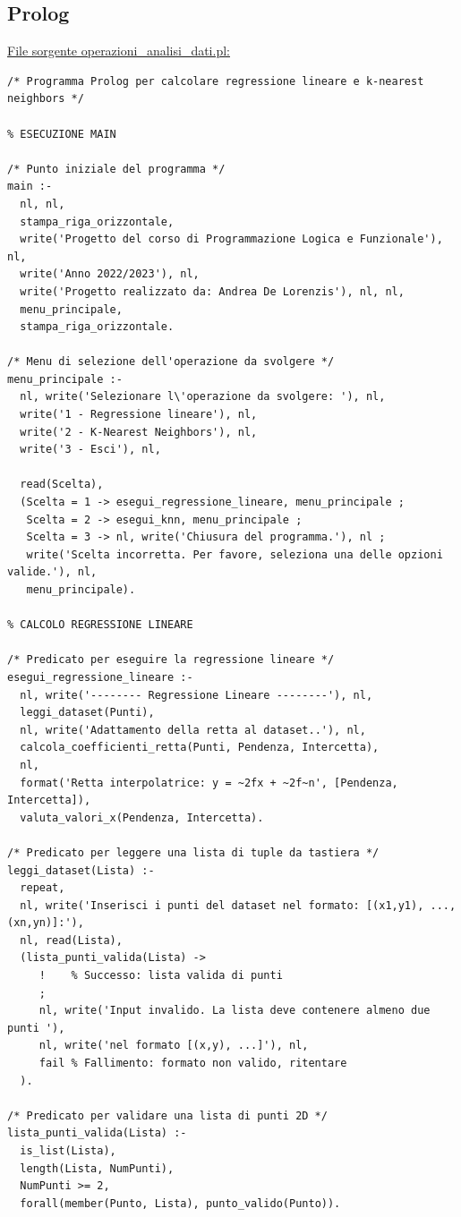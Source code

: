 \documentclass[11pt]{article}
\theoremstyle{definition}
\begin{document}
\subsection{Prolog}
\underline{File sorgente operazioni\_analisi\_dati.pl:}
\vspace{0.4cm}
\small
\begin{verbatim}
/* Programma Prolog per calcolare regressione lineare e k-nearest neighbors */

% ESECUZIONE MAIN

/* Punto iniziale del programma */
main :-
  nl, nl, 
  stampa_riga_orizzontale,
  write('Progetto del corso di Programmazione Logica e Funzionale'), nl,
  write('Anno 2022/2023'), nl,
  write('Progetto realizzato da: Andrea De Lorenzis'), nl, nl,
  menu_principale,
  stampa_riga_orizzontale.
  
/* Menu di selezione dell'operazione da svolgere */
menu_principale :-
  nl, write('Selezionare l\'operazione da svolgere: '), nl,
  write('1 - Regressione lineare'), nl,
  write('2 - K-Nearest Neighbors'), nl,
  write('3 - Esci'), nl,
  
  read(Scelta),
  (Scelta = 1 -> esegui_regressione_lineare, menu_principale ;
   Scelta = 2 -> esegui_knn, menu_principale ;
   Scelta = 3 -> nl, write('Chiusura del programma.'), nl ;
   write('Scelta incorretta. Per favore, seleziona una delle opzioni valide.'), nl,
   menu_principale). 

% CALCOLO REGRESSIONE LINEARE

/* Predicato per eseguire la regressione lineare */
esegui_regressione_lineare :-
  nl, write('-------- Regressione Lineare --------'), nl,
  leggi_dataset(Punti),
  nl, write('Adattamento della retta al dataset..'), nl,
  calcola_coefficienti_retta(Punti, Pendenza, Intercetta), 
  nl,
  format('Retta interpolatrice: y = ~2fx + ~2f~n', [Pendenza, Intercetta]),
  valuta_valori_x(Pendenza, Intercetta).

/* Predicato per leggere una lista di tuple da tastiera */
leggi_dataset(Lista) :-
  repeat,
  nl, write('Inserisci i punti del dataset nel formato: [(x1,y1), ..., (xn,yn)]:'), 
  nl, read(Lista),
  (lista_punti_valida(Lista) ->
     !    % Successo: lista valida di punti
     ;
     nl, write('Input invalido. La lista deve contenere almeno due punti '),
     nl, write('nel formato [(x,y), ...]'), nl,
     fail % Fallimento: formato non valido, ritentare
  ).

/* Predicato per validare una lista di punti 2D */
lista_punti_valida(Lista) :-
  is_list(Lista),
  length(Lista, NumPunti),
  NumPunti >= 2,
  forall(member(Punto, Lista), punto_valido(Punto)).
  

\end{verbatim}
\end{document}
